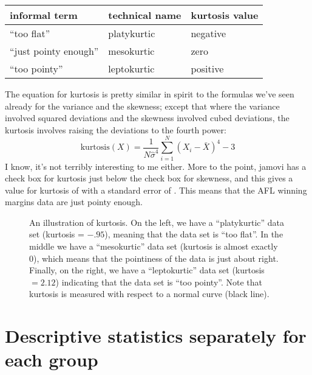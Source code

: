 \begin{center}
\begin{tabular}{lll}
informal term & technical name & kurtosis value \\ \hline
``too flat'' & platykurtic & negative \\
``just pointy enough'' & mesokurtic & zero \\
``too pointy'' & leptokurtic & positive 
\end{tabular}
\end{center}

The equation for kurtosis is pretty similar in spirit to the formulas we've seen already for the variance and the skewness; except that where the variance involved squared deviations and the skewness involved cubed deviations, the kurtosis involves raising the deviations to the fourth power:
$$
\mbox{kurtosis}(X) = \frac{1}{N \hat\sigma^4} \sum_{i=1}^N \left( X_i - \bar{X} \right)^4  - 3
$$
I know, it's not terribly interesting to me either. More to the point, jamovi has a check box for kurtosis just below the check box for skewness, and this gives a value for kurtosis of  with a standard error of . This means that the AFL winning margins data are just pointy enough.

\begin{figure}[h]
\begin{center}
\caption{An illustration of kurtosis. On the left, we have a ``platykurtic'' data set (kurtosis = $-.95$), meaning that the data set is ``too flat''. In the middle we have a ``mesokurtic'' data set (kurtosis is almost exactly 0), which means that the pointiness of the data is just about right. Finally, on the right, we have a ``leptokurtic'' data set (kurtosis $= 2.12$) indicating that the data set is ``too pointy''. Note that kurtosis is measured with respect to a normal curve (black line).}
\label{fig:kurtosis}
\HR
\end{center}
\end{figure}


\section{Descriptive statistics separately for each group~\label{sec:groupdescriptives}}

